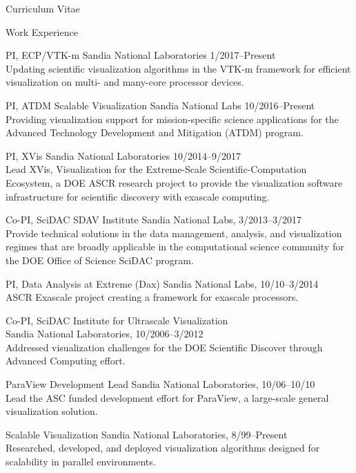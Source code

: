 \documentclass{article}
\begin{document}
\begin{cv}{Curriculum Vitae}
    \begin{cvlist}{Work Experience}
    \item[PI, ECP/VTK-m]\hfill Sandia National Laboratories 1/2017--Present\\
      Updating scientific visualization algorithms in the VTK-m framework for efficient visualization on multi- and many-core processor devices.
    \item[PI, ATDM Scalable Visualization]\hfill Sandia National Labs 10/2016--Present\\
      Providing visualization support for mission-specific science applications for the Advanced Technology Development and Mitigation (ATDM) program.
    \item[PI, XVis]\hfill Sandia National Laboratories 10/2014--9/2017\\
      Lead XVis, Visualization for the Extreme-Scale Scientific-Computation Ecosystem, a DOE ASCR research project to provide the visualization software infrastructure for scientific discovery with exascale computing.
    \item[Co-PI, SciDAC SDAV Institute]\hfill Sandia National Labs, 3/2013--3/2017\\
      Provide technical solutions in the data management, analysis, and
      visualization regimes that are broadly applicable in the
      computational science community for the DOE Office of Science SciDAC program.
    \item[PI, Data Analysis at Extreme (Dax)]\hfill Sandia National Labs, 10/10--3/2014\\
      ASCR Exascale project creating a framework for exascale processors.
    \item[Co-PI, SciDAC Institute for Ultrascale Visualization]~\\\hfill Sandia National Laboratories, 10/2006--3/2012\\
      Addressed visualization challenges for the DOE Scientific Discover
      through Advanced Computing effort.
    \item[ParaView Development Lead]\hfill Sandia National Laboratories, 10/06--10/10\\
      Lead the ASC funded development effort for ParaView, a large-scale
      general visualization solution.
    \item[Scalable Visualization]\hfill Sandia National Laboratories, 8/99--Present \\
      Researched, developed, and deployed visualization algorithms designed
      for scalability in parallel environments.

\end{cvlist}
\end{cv}
\end{document}
